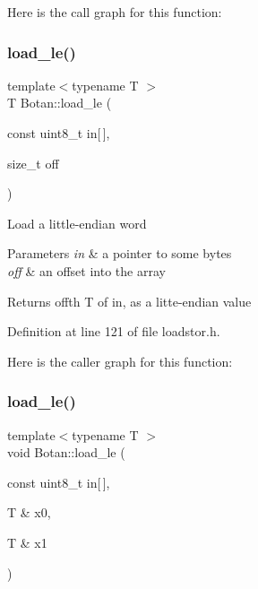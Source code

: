 Here is the call graph for this function\+:
\mbox{\label{namespace_botan_a745efa1d08234fe3b785f17c19ec26b7}} 
\subsubsection{\texorpdfstring{load\+\_\+le()}{load\_le()}\hspace{0.1cm}{\footnotesize\ttfamily [1/5]}}
{\footnotesize\ttfamily template$<$typename T $>$ \\
T Botan\+::load\+\_\+le (\begin{DoxyParamCaption}\item[{const uint8\+\_\+t}]{in\mbox{[}$\,$\mbox{]},  }\item[{size\+\_\+t}]{off }\end{DoxyParamCaption})\hspace{0.3cm}{\ttfamily [inline]}}

Load a little-\/endian word 
\begin{DoxyParams}{Parameters}
{\em in} & a pointer to some bytes \\
\hline
{\em off} & an offset into the array \\
\hline
\end{DoxyParams}
\begin{DoxyReturn}{Returns}
off\textquotesingle{}th T of in, as a litte-\/endian value 
\end{DoxyReturn}


Definition at line 121 of file loadstor.\+h.

Here is the caller graph for this function\+:
\mbox{\label{namespace_botan_abb60b6e5af3132bc5095cfcbaa90fc35}} 
\subsubsection{\texorpdfstring{load\+\_\+le()}{load\_le()}\hspace{0.1cm}{\footnotesize\ttfamily [2/5]}}
{\footnotesize\ttfamily template$<$typename T $>$ \\
void Botan\+::load\+\_\+le (\begin{DoxyParamCaption}\item[{const uint8\+\_\+t}]{in\mbox{[}$\,$\mbox{]},  }\item[{T \&}]{x0,  }\item[{T \&}]{x1 }\end{DoxyParamCaption})\hspace{0.3cm}{\ttfamily [inline]}}

